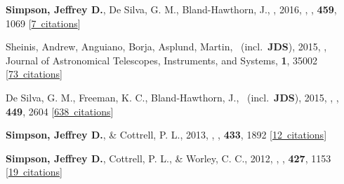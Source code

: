 \item[{\color{numcolor}\scriptsize5}] \textbf{Simpson, Jeffrey D.}, De Silva, G. M., Bland-Hawthorn, J., \etal, 2016, , \mnras, \textbf{459}, 1069 [\href{https://ui.adsabs.harvard.edu/#abs/2016MNRAS.459.1069S}{7~citations}]

\item[{\color{numcolor}\scriptsize4}] Sheinis, Andrew, Anguiano, Borja, Asplund, Martin, \etal\ (incl.\ \textbf{JDS}), 2015, , Journal of Astronomical Telescopes, Instruments, and Systems, \textbf{1}, 35002 [\href{https://ui.adsabs.harvard.edu/#abs/2015JATIS...1c5002S}{73~citations}]

\item[{\color{numcolor}\scriptsize3}] De Silva, G. M., Freeman, K. C., Bland-Hawthorn, J., \etal\ (incl.\ \textbf{JDS}), 2015, , \mnras, \textbf{449}, 2604 [\href{https://ui.adsabs.harvard.edu/#abs/2015MNRAS.449.2604D}{638~citations}]

\item[{\color{numcolor}\scriptsize2}] \textbf{Simpson, Jeffrey D.}, \& Cottrell, P. L., 2013, , \mnras, \textbf{433}, 1892 [\href{https://ui.adsabs.harvard.edu/#abs/2013MNRAS.433.1892S}{12~citations}]

\item[{\color{numcolor}\scriptsize1}] \textbf{Simpson, Jeffrey D.}, Cottrell, P. L., \& Worley, C. C., 2012, , \mnras, \textbf{427}, 1153 [\href{https://ui.adsabs.harvard.edu/#abs/2012MNRAS.427.1153S}{19~citations}]